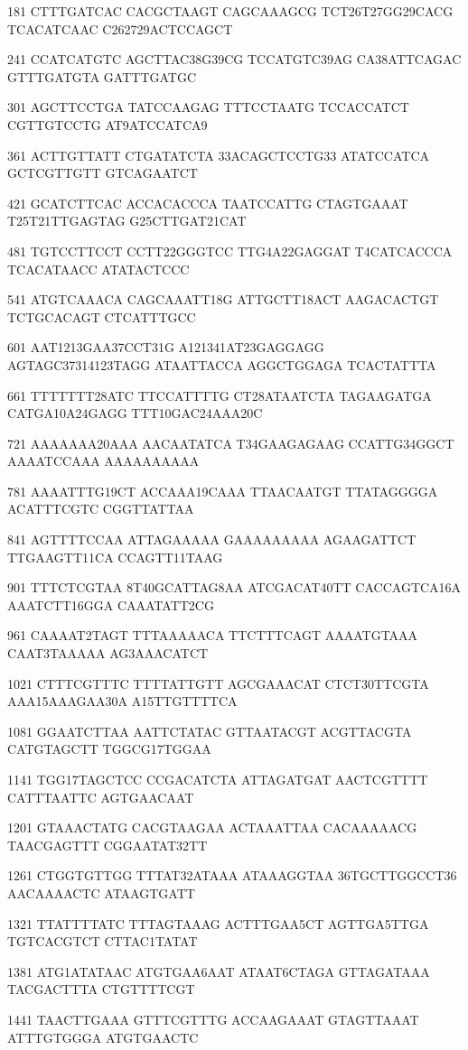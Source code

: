 \begin{enumerate}
{181    CTTTGATCAC CACGCTAAGT CAGCAAAGCG TCT26T27GG29CACG TCACATCAAC C262729ACTCCAGCT

241    CCATCATGTC AGCTTAC38G39CG TCCATGTC39AG CA38ATTCAGAC GTTTGATGTA GATTTGATGC

301    AGCTTCCTGA TATCCAAGAG TTTCCTAATG TCCACCATCT CGTTGTCCTG AT9ATCCATCA9

361    ACTTGTTATT CTGATATCTA 33ACAGCTCCTG33 ATATCCATCA GCTCGTTGTT GTCAGAATCT

421    GCATCTTCAC ACCACACCCA TAATCCATTG CTAGTGAAAT T25T21TTGAGTAG G25CTTGAT21CAT

481    TGTCCTTCCT CCTT22GGGTCC TTG4A22GAGGAT T4CATCACCCA TCACATAACC ATATACTCCC

541    ATGTCAAACA CAGCAAATT18G ATTGCTT18ACT AAGACACTGT TCTGCACAGT CTCATTTGCC

601    AAT1213GAA37CCT31G A121341AT23GAGGAGG AGTAGC37314123TAGG ATAATTACCA AGGCTGGAGA TCACTATTTA

661    TTTTTTT28ATC TTCCATTTTG CT28ATAATCTA TAGAAGATGA CATGA10A24GAGG TTT10GAC24AAA20C

721    AAAAAAA20AAA AACAATATCA T34GAAGAGAAG CCATTG34GGCT AAAATCCAAA AAAAAAAAAA

781    AAAATTTG19CT ACCAAA19CAAA TTAACAATGT TTATAGGGGA ACATTTCGTC CGGTTATTAA

841    AGTTTTCCAA ATTAGAAAAA GAAAAAAAAA AGAAGATTCT TTGAAGTT11CA CCAGTT11TAAG

901    TTTCTCGTAA 8T40GCATTAG8AA ATCGACAT40TT CACCAGTCA16A AAATCTT16GGA CAAATATT2CG

961    CAAAAT2TAGT TTTAAAAACA TTCTTTCAGT AAAATGTAAA CAAT3TAAAAA AG3AAACATCT

1021   CTTTCGTTTC TTTTATTGTT AGCGAAACAT CTCT30TTCGTA AAA15AAAGAA30A A15TTGTTTTCA

1081   GGAATCTTAA AATTCTATAC GTTAATACGT ACGTTACGTA CATGTAGCTT TGGCG17TGGAA

1141   TGG17TAGCTCC CCGACATCTA ATTAGATGAT AACTCGTTTT CATTTAATTC AGTGAACAAT

1201   GTAAACTATG CACGTAAGAA ACTAAATTAA CACAAAAACG TAACGAGTTT CGGAATAT32TT

1261   CTGGTGTTGG TTTAT32ATAAA ATAAAGGTAA 36TGCTTGGCCT36 AACAAAACTC ATAAGTGATT

1321   TTATTTTATC TTTAGTAAAG ACTTTGAA5CT AGTTGA5TTGA TGTCACGTCT CTTAC1TATAT

1381   ATG1ATATAAC ATGTGAA6AAT ATAAT6CTAGA GTTAGATAAA TACGACTTTA CTGTTTTCGT

1441   TAACTTGAAA GTTTCGTTTG ACCAAGAAAT GTAGTTAAAT ATTTGTGGGA ATGTGAACTC

}
\end{enumerate}
